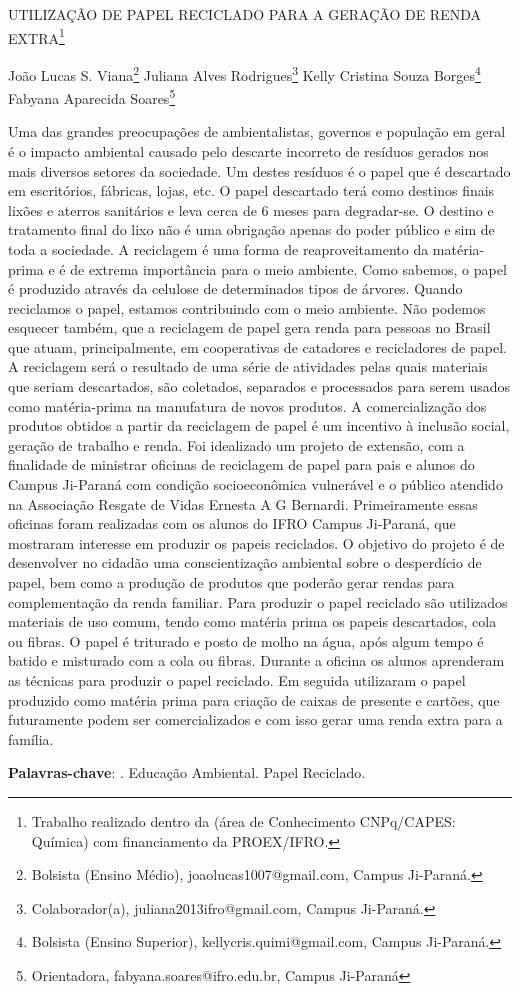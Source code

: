 \documentclass[article,12pt,onesidea,4paper,english,brazil]{abntex2}
\begin{document}
	
	
	\frenchspacing 
	
	\begin{center}
		\LARGE UTILIZAÇÃO DE PAPEL RECICLADO PARA A GERAÇÃO DE RENDA EXTRA\footnote{Trabalho realizado dentro da (área de Conhecimento CNPq/CAPES: Química) com financiamento da PROEX/IFRO.}
		
		\normalsize
		João Lucas S. Viana\footnote{Bolsista (Ensino Médio), joaolucas1007@gmail.com, Campus Ji-Paraná.} 
		Juliana Alves Rodrigues\footnote{Colaborador(a), juliana2013ifro@gmail.com, Campus Ji-Paraná.} 
		Kelly Cristina Souza Borges\footnote{Bolsista (Ensino Superior), kellycris.quimi@gmail.com, Campus Ji-Paraná.} 
		Fabyana Aparecida Soares\footnote{Orientadora, fabyana.soares@ifro.edu.br, Campus Ji-Paraná} 
	\end{center}
	
	\noindent Uma das grandes preocupações de ambientalistas, governos e população em geral é o impacto ambiental causado pelo descarte incorreto de resíduos gerados nos mais diversos setores da sociedade. Um destes resíduos é o papel que é descartado em escritórios, fábricas, lojas, etc. O papel descartado terá como destinos finais lixões e aterros sanitários e leva cerca de 6 meses para degradar-se. O destino e tratamento final do lixo não é uma obrigação apenas do poder público e sim de toda a sociedade.  A reciclagem é uma forma de reaproveitamento da matéria-prima e é de extrema importância para o meio ambiente. Como sabemos, o papel é produzido através da celulose de determinados tipos de árvores. Quando reciclamos o papel, estamos contribuindo com o meio ambiente. Não podemos esquecer também, que a reciclagem de papel gera renda para pessoas no Brasil que atuam, principalmente, em cooperativas de catadores e recicladores de papel. A reciclagem será o resultado de uma série de atividades pelas quais materiais que seriam descartados, são coletados, separados e processados para serem usados como matéria-prima na manufatura de novos produtos. A comercialização dos produtos obtidos a partir da reciclagem de papel é um incentivo à inclusão social, geração de trabalho e renda. Foi idealizado um projeto de extensão, com a finalidade de ministrar oficinas de reciclagem de papel para pais e alunos do Campus Ji-Paraná com condição socioeconômica vulnerável e o público atendido na Associação Resgate de Vidas Ernesta A G Bernardi. Primeiramente essas oficinas foram realizadas com os alunos do IFRO Campus Ji-Paraná, que mostraram interesse em produzir os papeis reciclados. O objetivo do projeto é de desenvolver no cidadão uma conscientização ambiental sobre o desperdício de papel, bem como a produção de produtos que poderão gerar rendas para complementação da renda familiar. Para produzir o papel reciclado são utilizados materiais de uso comum, tendo como matéria prima os papeis descartados, cola ou fibras. O papel é triturado e posto de molho na água, após algum tempo é batido e misturado com a cola ou fibras. Durante a oficina os alunos aprenderam as técnicas para produzir o papel reciclado. Em seguida utilizaram o papel produzido como matéria prima para criação de caixas de presente e cartões, que futuramente podem ser comercializados e com isso gerar uma renda extra para a família.
	
	\vspace{\onelineskip}
	
	\noindent
	\textbf{Palavras-chave}: . Educação Ambiental. Papel Reciclado.
	
\end{document}
